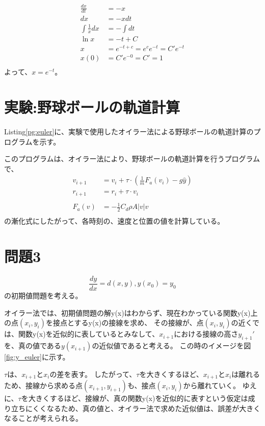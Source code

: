 \documentclass[a4paper, 11pt, titlepage]{jsarticle}
\begin{document}
\begin{align*}
	\frac{dx}{dt} &= -x\\
	dx &= -xdt\\
	\int \frac{1}{x}dx &= -\int dt\\
	\ln x &= -t + C\\
	x &= e^{-t + c} = e^{c}e^{-t} = C'e^{-t}\\
	x(0) &= C'e^{-0} = C' = 1\\
\end{align*}
よって、$x = e^{-t}$。

\section{実験:野球ボールの軌道計算}
Listing\ref{pg:euler}に、実験で使用したオイラー法による野球ボールの軌道計算のプログラムを示す。

このプログラムは、オイラー法により、野球ボールの軌道計算を行うプログラムで、
\begin{align*}
	v_{i+1} &= v_{i} + \tau \cdot (\frac{1}{m} F_a(v_{i}) - g\hat{y})\\
	r_{i+1} &= r_{i} + \tau \cdot v_{i}\\
	\\
	F_a(v) &= -\frac{1}{2}C_d\rho A|v|v\\
\end{align*}
の漸化式にしたがって、各時刻の、速度と位置の値を計算している。



\section{問題3}
$$
\frac{dy}{dx} = d(x,y), y(x_0) = y_0
$$
の初期値問題を考える。

オイラー法では、初期値問題の解y(x)はわからず、現在わかっている関数y(x)上の点$(x_i, y_i)$を接点とするy(x)の接線を求め、
その接線が、点$(x_i, y_i)$の近くでは、関数y(x)を近似的に表しているとみなして、$x_{i+1}$における接線の高さ$y_{i+1}'$を、真の値である$y(x_{i+1})$の近似値であると考える。
この時のイメージを図\ref{fig:y_euler}に示す。

$\tau$は、$x_{i+1}とx_i$の差を表す。
したがって、$\tau$を大きくするほど、$x_{i+1}とx_i$は離れるため、接線から求める点$(x_{i+1}, y_{i+1})$も、接点$(x_i, y_i)$から離れていく。
ゆえに、$\tau$を大きくするほど、接線が、真の関数y(x)を近似的に表すという仮定は成り立ちにくくなるため、真の値と、オイラー法で求めた近似値は、誤差が大きくなることが考えられる。
\end{document}
